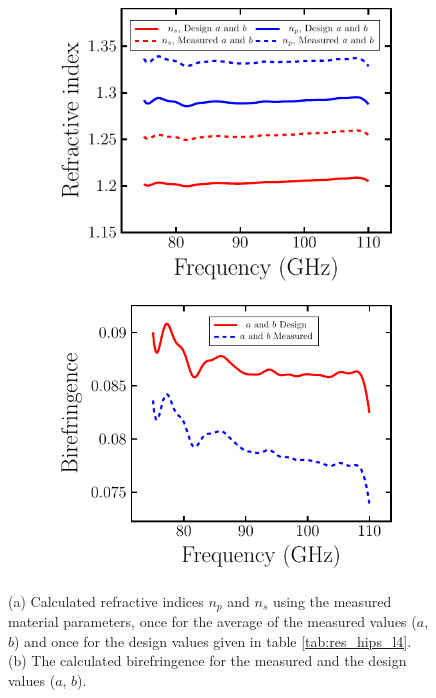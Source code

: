 \begin{figure}[H]
    \begin{subfigure}[b]{.5\linewidth}
    \caption{}\label{}
    \centering\includegraphics[scale=0.65]{images/results/plots/polymer/dimension_errors/ri_stripe_error_a.pdf}
    \end{subfigure}%
    \begin{subfigure}[b]{.5\linewidth}
    \caption{}\label{}
    \centering\includegraphics[scale=0.65]{images/results/plots/polymer/dimension_errors/ri_stripe_error_b.pdf}
    \end{subfigure}
    \caption{(a) Calculated refractive indices $n_p$ and $n_s$ using the measured material parameters, once for the average of the measured values ($a$, $b$) and once for the design values given in table \ref{tab:res_hips_l4}. (b) The calculated birefringence for the measured and the design values ($a$, $b$).}
    \label{fig:ri_stripe_err}
\end{figure}

